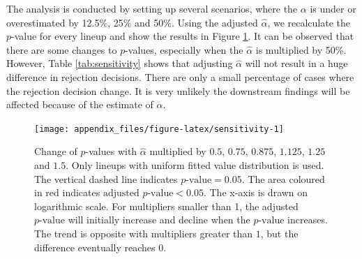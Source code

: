 \documentclass[]{interact}
\theoremstyle{plain}%
\theoremstyle{definition}
\theoremstyle{remark}
\begin{document}
The analysis is conducted by setting up several scenarios, where the
\(\alpha\) is under or overestimated by 12.5\%, 25\% and 50\%. Using the
adjusted \(\hat{\alpha}\), we recalculate the \(p\)-value for every
lineup and show the results in Figure \ref{fig:sensitivity}. It can be
observed that there are some changes to \(p\)-values, especially when
the \(\hat{\alpha}\) is multiplied by 50\%. However, Table
\ref{tab:sensitivity} shows that adjusting \(\hat{\alpha}\) will not
result in a huge difference in rejection decisions. There are only a
small percentage of cases where the rejection decision change. It is
very unlikely the downstream findings will be affected because of the
estimate of \(\alpha\).

\begin{figure}

{\centering \texttt{[image: appendix\_files/figure-latex/sensitivity-1]} 

}

\caption{Change of $p$-values with $\hat{\alpha}$ multiplied by $0.5$, $0.75$, $0.875$, $1.125$, $1.25$ and $1.5$. Only lineups with uniform fitted value distribution is used. The vertical dashed line indicates $p\text{-value} = 0.05$. The area coloured in red indicates $\text{adjusted }p\text{-value} < 0.05$. The x-axis is drawn on logarithmic scale. For multipliers smaller than 1, the adjusted $p\text{-value}$ will initially increase and decline when the $p\text{-value}$ increases. The trend is opposite with multipliers greater than $1$, but the difference eventually reaches $0$.}\label{fig:sensitivity}
\end{figure}

\begin{table}

\caption{\label{tab:sensitivity}Examining how decisions might change if $\hat{\alpha}$ was different. Percentage of lineups that where the $p$-value would switch to above or below 0.05, when $\hat{\alpha}$ is multiplied by a multiplier.}
\centering
{}
\end{table}
\end{document}
